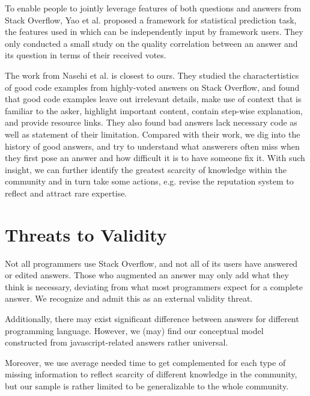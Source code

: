 \documentclass[10pt,conference]{IEEEtran}
\begin{document}
To enable people to jointly leverage features of both questions and answers from Stack Overflow, Yao et al. \cite{DBLP:journals/corr/YaoTXAXL13} proposed a framework for statistical prediction task, the features used in which can be independently input by framework users. They only conducted a small study on the quality correlation between an answer and its question in terms of their received votes.  

The work from Nasehi et al. \cite{DBLP:conf/icsm/NasehiSMB12} is closest to ours. They studied the charactertistics of good code examples from highly-voted answers on Stack Overflow, and found that good code examples leave out irrelevant details, make use of context that is familiar to the asker, highlight important content, contain step-wise explanation, and provide resource links. They also found bad answers lack necessary code as well as statement of their limitation. Compared with their work, we dig into the history of good answers, and try to understand what answerers often miss when they first pose an answer and how difficult it is to have someone fix it. With such insight, we can further identify the greatest scarcity of knowledge within the community and in turn take some actions, e.g. revise the reputation system to reflect and attract rare expertise.      

\section {Threats to Validity}
Not all programmers use Stack Overflow, and not all of its users have answered or edited answers. Those who augmented an answer may only add what they think is necessary, deviating from what most programmers expect for a complete answer. We recognize and admit this as an external validity threat. 

Additionally, there may exist significant difference between answers for different programming language. However, we (may) find our conceptual model constructed from javascript-related answers rather universal.

Moreover, we use average needed time to get complemented for each type of missing information to reflect scarcity of different knowledge in the community, but our sample is rather limited to be generalizable to the whole community. 






\end{document}
